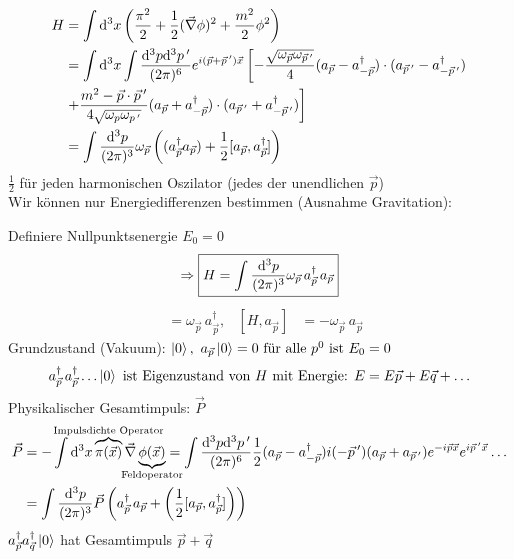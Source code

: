 	\begin{align*}
		H &= \int \mathrm{d}^3 x 
		\left(
			\frac{\pi^2}{2} + \frac{1}{2} (\vec{\nabla} \phi)^2 + \frac{m^2}{2} \phi^2
		\right) \\
		&= \int \mathrm{d}^3 x \int \frac{\mathrm{d}^3 p \mathrm{d}^3 p\,'}{(2\pi)^6} e^{i (\vec{p} + \vec{p}\,')\vec{x}} 
		\left[
			- \frac{\sqrt{\omega_{\vec{p}} \omega_{\vec{p}\,'}}}{4} 
			(a_{\vec{p}} - a_{-\vec{p}}^\dagger) \cdot (a_{\vec{p}\,'} - a_{-\vec{p}\,'}^\dagger)
		\right.\\
		&\left.
			+ \frac{m^2 - \vec{p} \cdot \vec{p}\,'}{4\sqrt{\omega_p \omega_{p\,'}}}
			(a_{\vec{p}} + a_{-\vec{p}}^\dagger) \cdot (a_{\vec{p}\,'} + a_{-\vec{p}\,'}^\dagger)
		\right] \\
		&= \int \frac{\mathrm{d}^3 p}{(2 \pi)^3} \omega_{\vec{p}} 
		\left(
			(a^\dagger_{\vec{p}} a_{\vec{p}}) + \frac{1}{2} [a_{\vec{p}}, a^\dagger_{\vec{p}}]
		\right)
	\end{align*}
$\frac{1}{2}$ für jeden harmonischen Oszilator (jedes der unendlichen $\vec{p}$)
\\ 
Wir können nur Energiedifferenzen bestimmen (Ausnahme Gravitation):
 
Definiere Nullpunktsenergie $E_0 = 0$
	\begin{align*}
		\Rightarrow \boxed{H = \int \frac{\mathrm{d}^3 p}{(2 \pi)^3} \omega_{\vec{p}}\, a_{\vec{p}}^\dagger \,a_{\vec{p}}}
	\end{align*}
	\begin{align*}
		[H, a_{\vec{p}}^\dagger] &= \omega_{\vec{p}}\, a_{\vec{p}}^\dagger ,&
		[H, a_{\vec{p}}] &= - \omega_{\vec{p}} \,a_{\vec{p}}
	\end{align*}
Grundzustand (Vakuum): 
$\ket{0}, ~a_{\vec{p}}\ket{0} = 0 ~\text{für alle }p^0 \text{ ist }E_0 = 0$
	\begin{align*}
		a_{\vec{p}}^\dagger \,a_{\vec{p}}^\dagger \ldots \ket{0} \text{ ist Eigenzustand von } H \text{ mit Energie: }  E= E\vec{p} + E\vec{q} + \ldots
	\end{align*}
Physikalischer Gesamtimpuls: $\vec{P}$
	\begin{align*}
		\vec{P} &= - \int \diff^3 x \overbrace{\pi (\vec{x})}^{\mathclap{\text{Impulsdichte Operator}}} \vec{\nabla} \underbrace{\phi(\vec{x})}_{\mathclap{\text{Feldoperator}}}
		= \int \frac{\diff^3 p \diff^3 p\,'}{(2\pi)^6} \frac{1}{2} (a_{\vec{p}} - a_{-\vec{p}}^\dagger) i (- \vec{p}\,') (a_{\vec{p}} + a_{\vec{p}\,'}) e^{-i\vec{p} \vec{x}} e^{i \vec{p}\,' \vec{x}} \ldots \\
		&= \int \frac{\diff^3 p}{(2\pi)^3} \vec{P} 
		\left(
			a_{\vec{p}}^\dagger \,a_{\vec{p}} + \left(\frac{1}{2} [a_{\vec{p}}, a_{\vec{p}}^\dagger] \right)
		\right)
	\end{align*}
$a_{\vec{p}}^\dagger a_{\vec{q}}^\dagger \ket{0}$ hat Gesamtimpuls $\vec{p} + \vec{q}$

